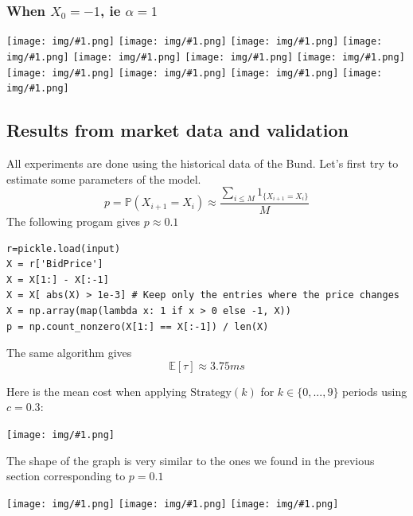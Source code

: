 \documentclass{article}
\newcommand{\IMG}[1] { \texttt{[image: img/\#1.png]} }
\newcommand{\IMGG}[1] { \texttt{[image: img/\#1.png]} }
\newcommand{\IMGC}[1] {
\begin{center} \texttt{[image: img/\#1.png]} \end{center}
 }
\begin{document}
\newpage

\subsubsection*{When $X_0 = -1$, ie $\alpha=1$}

\begin{center}

\IMGG{legend}
\IMG{11} 
\IMG{12} 
\IMG{13} 
\IMG{14} 
\IMG{15} 
\IMG{17} 
\IMG{18} 
\IMG{19} 
\IMG{20}
\IMG{21}

\end{center}

\newpage

\subsection{Results from market data and validation}
All experiments are done using the historical data of the Bund. Let's first try to estimate some parameters of the model.
$$ p = \mathbb{P}(X_{i+1} = X_i)  \approx \frac{ \sum_{i \leq M} 1_{ \{X_{i+1} = X_i \} } }{M} $$
The following progam gives $p \approx 0.1$

\begin{verbatim}
r=pickle.load(input)
X = r['BidPrice']
X = X[1:] - X[:-1]
X = X[ abs(X) > 1e-3] # Keep only the entries where the price changes
X = np.array(map(lambda x: 1 if x > 0 else -1, X))
p = np.count_nonzero(X[1:] == X[:-1]) / len(X)
\end{verbatim}

The same algorithm gives $$\mathbb{E}[ \tau ] \approx 3.75 ms$$

Here is the mean cost when applying $\text{Strategy}(k)$ for $k \in \{0, ... ,9 \}$ periods using $c=0.3$:

\IMGC{esp_market}

The shape of the graph is very similar to the ones we found in the previous section corresponding to $p = 0.1$
\begin{center}
\IMGG{legend}
\IMG{1}
\IMG{12}
\end{center}

\newpage
\end{document}
